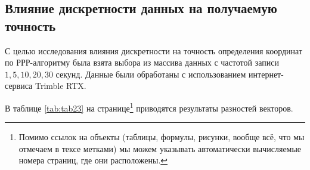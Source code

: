 \subsection{Влияние дискретности данных на получаемую точность}\label{subsec:ch2/sec3/sub4}


С целью исследования влияния дискретности на точность определения координат по РРР-алгоритму была взята выбора из массива данных с частотой записи $1, 5, 10, 20, 30$ секунд. Данные были обработаны с использованием интернет-сервиса Trimble RTX.

В таблице \cref{tab:tab23} на странице\footnote{Помимо ссылок на объекты (таблицы, формулы, рисунки, вообще всё, что мы отмечаем в тексе метками) мы можем указывать автоматически вычисляемые номера страниц, где они расположены.} \pageref{tab:tab23} приводятся результаты разностей векторов.




